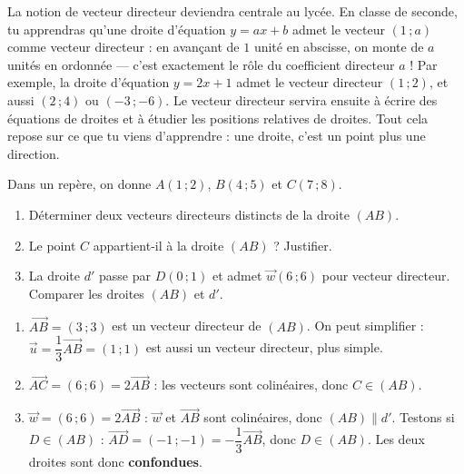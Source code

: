 \documentclass[11pt]{article}
\newcounter{popsec}
\newcounter{popsub}
\newcommand{\courssub}[1]{%
  \stepcounter{popsub}%
  \par\vspace{9pt}\noindent{\popxbold\fontsize{11.5}{13}\selectfont\color{popink}{\color{poporange}\thepopsec.\thepopsub}\hspace{6pt}#1}\par\nopagebreak\vspace{4pt}
}
\begin{document}
\courssub{Vers la classe de seconde}

\begin{savaistu}
La notion de vecteur directeur deviendra centrale au lycée. En classe de seconde, tu apprendras qu'une droite d'équation $y = ax + b$ admet le vecteur $(1\,;a)$ comme vecteur directeur : en avançant de $1$ unité en abscisse, on monte de $a$ unités en ordonnée — c'est exactement le rôle du coefficient directeur $a$ ! Par exemple, la droite d'équation $y = 2x + 1$ admet le vecteur directeur $(1\,;2)$, et aussi $(2\,;4)$ ou $(-3\,;-6)$. Le vecteur directeur servira ensuite à écrire des équations de droites et à étudier les positions relatives de droites. Tout cela repose sur ce que tu viens d'apprendre : une droite, c'est un point plus une direction.
\end{savaistu}

\begin{exercice}
Dans un repère, on donne $A(1\,;2)$, $B(4\,;5)$ et $C(7\,;8)$.
\begin{enumerate}
\item Déterminer deux vecteurs directeurs distincts de la droite $(AB)$.
\item Le point $C$ appartient-il à la droite $(AB)$ ? Justifier.
\item La droite $d'$ passe par $D(0\,;1)$ et admet $\vec{w}(6\,;6)$ pour vecteur directeur. Comparer les droites $(AB)$ et $d'$.
\end{enumerate}
\end{exercice}

\begin{corrige}[Exercice]
\begin{enumerate}
\item $\overrightarrow{AB} = (3\,;3)$ est un vecteur directeur de $(AB)$. On peut simplifier : $\vec{u} = \dfrac{1}{3}\overrightarrow{AB} = (1\,;1)$ est aussi un vecteur directeur, plus simple.
\item $\overrightarrow{AC} = (6\,;6) = 2\overrightarrow{AB}$ : les vecteurs sont colinéaires, donc $C \in (AB)$.
\item $\vec{w} = (6\,;6) = 2\overrightarrow{AB}$ : $\vec{w}$ et $\overrightarrow{AB}$ sont colinéaires, donc $(AB) \parallel d'$. Testons si $D \in (AB)$ : $\overrightarrow{AD} = (-1\,;-1) = -\dfrac{1}{3}\overrightarrow{AB}$, donc $D \in (AB)$. Les deux droites sont donc \textbf{confondues}.
\end{enumerate}
\end{corrige}
\end{document}
